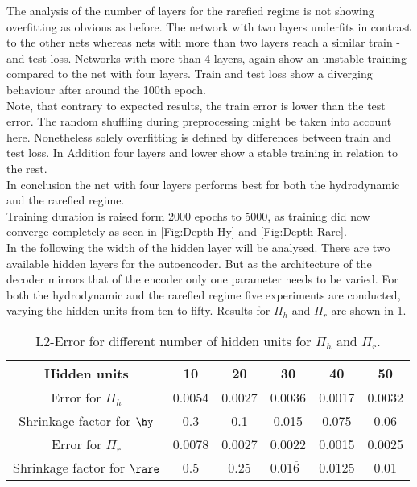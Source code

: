 The analysis of the number of layers for the rarefied regime is not showing overfitting as obvious as before. The network with two layers underfits in contrast to the other nets whereas nets with more than two layers reach a similar train - and test loss. Networks with more than 4 layers, again show an unstable training compared to the net with four layers. Train and test loss show a diverging behaviour after around the 100th epoch.\\
Note, that contrary to expected results, the train error is lower than the test error. The random shuffling during preprocessing might be taken into account here. Nonetheless solely overfitting is defined by differences between train and test loss. In Addition four layers and lower show a stable training in relation to the rest.\\
In conclusion the net with four layers performs best for both the hydrodynamic and the rarefied regime.\\
Training duration is raised form 2000 epochs to 5000, as training did now converge completely as seen in \cref{Fig:Depth Hy} and \cref{Fig:Depth Rare}.\\
In the following the width of the hidden layer will be analysed. There are two available hidden layers for the autoencoder. But as the architecture of the decoder mirrors that of the encoder only one parameter needs to be varied. For both the hydrodynamic and the rarefied regime five experiments are conducted, varying the hidden units from ten to fifty. Results for \(\Pi_h\) and \(\Pi_r\) are shown in \cref{Tab:Hidden Units}.
\begin{table}[!htbp]\centering
	\begin{tabular}{ |c|c|c|c|c|c| }
		\hline
		Hidden units & 10 & 20 & 30  & 40 & 50 \\ [.5ex]
		\hline
		Error for \(\Pi_h\) & 0.0054 & 0.0027 & 0.0036 & 0.0017 & 0.0032\\ \hline
		Shrinkage factor for $\hy$ & 0.3 & 0.1 & 0.015 & 0.075 & 0.06\\ \hline
		Error for \(\Pi_r\)& 0.0078 & 0.0027 & 0.0022 & 0.0015 & 0.0025\\ \hline
		Shrinkage factor for $\rare$ & 0.5 & 0.25 & 0.01$\overline{6}$\ & 0.0125 & 0.01\\ \hline
	\end{tabular}
	\caption{L2-Error for different number of hidden units for \(\Pi_h\) and \(\Pi_r\).}
	\label{Tab:Hidden Units}
\end{table}
